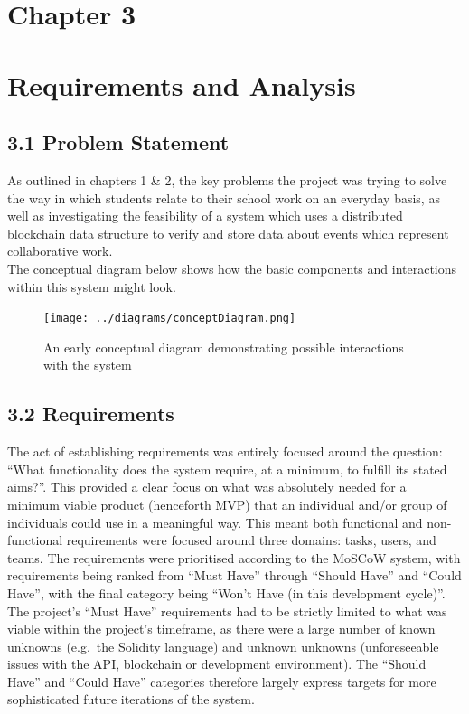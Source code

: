 \documentclass[12pt]{report}
\begin{document}
\clearpage

\section{Chapter 3}\label{chapter-3-1}

\section{Requirements and Analysis}\label{requirements-and-analysis}

\subsection{3.1 Problem Statement}\label{problem-statement}

As outlined in chapters 1 \& 2, the key problems the project was trying
to solve the way in which students relate to their school work on an
everyday basis, as well as investigating the feasibility of a system
which uses a distributed blockchain data structure to verify and store
data about events which represent collaborative work.\\
The conceptual diagram below shows how the basic components and
interactions within this system might look.

\begin{figure}[htbp]
\centering
\texttt{[image: ../diagrams/conceptDiagram.png]}
\caption{An early conceptual diagram demonstrating possible interactions
with the system}
\end{figure}

\subsection{3.2 Requirements}\label{requirements}

The act of establishing requirements was entirely focused around the
question: ``What functionality does the system require, at a minimum, to
fulfill its stated aims?''. This provided a clear focus on what was
absolutely needed for a minimum viable product (henceforth
MVP)\cite{ries2009minimum} that an individual and/or group of individuals could use in
a meaningful way. This meant both functional and non-functional
requirements were focused around three domains: tasks, users, and teams.
The requirements were prioritised according to the MoSCoW
system\cite{1moscow},
with requirements being ranked from ``Must Have'' through ``Should
Have'' and ``Could Have'', with the final category being ``Won't Have
(in this development cycle)''. The project's ``Must Have'' requirements
had to be strictly limited to what was viable within the project's
timeframe, as there were a large number of known unknowns (e.g.~the
Solidity language) and unknown unknowns (unforeseeable issues with the
API, blockchain or development environment). The ``Should Have'' and
``Could Have'' categories therefore largely express targets for more
sophisticated future iterations of the system.
\end{document}
